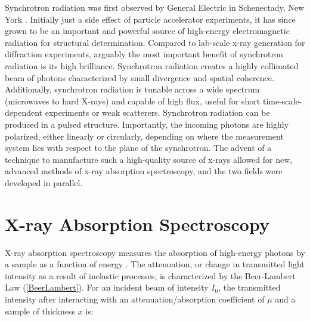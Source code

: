 

Synchrotron radiation was first observed by General Electric in Schenectady, New York \cite{firstSynchrotronRadPaper}. Initially just a side effect of particle accelerator experiments, it has since grown to be an important and powerful source of high-energy electromagnetic radiation for structural determination. Compared to lab-scale x-ray generation for diffraction experiments, arguably the most important benefit of synchrotron radiation is its high brilliance. Synchrotron radiation creates a highly collimated beam of photons characterized by small divergence and spatial coherence. Additionally, synchrotron radiation is tunable across a wide spectrum (microwaves to hard X-rays) and capable of high flux, useful for short time-scale-dependent experiments or weak scatterers. Synchrotron radiation can be produced in a pulsed structure. Importantly, the incoming photons are highly polarized, either linearly or circularly, depending on where the measurement system lies with respect to the plane of the synchrotron. The advent of a technique to manufacture such a high-quality source of x-rays allowed for new, advanced methods of x-ray absorption spectroscopy, and the two fields were developed in parallel. 

\section{X-ray Absorption Spectroscopy}
X-ray absorption spectroscopy measures the absorption of high-energy photons by a sample as a function of energy \cite{gardenghi2012synchrotron}. The attenuation, or change in transmitted light intensity as a result of inelastic processes, is characterized by the Beer-Lambert Law (\ref{BeerLambert}). For an incident beam of intensity $I_0$, the transmitted intensity after interacting with an  attenuation/absorption 
coefficient of $ \mu $ and a sample of thickness $ x $ is: 


